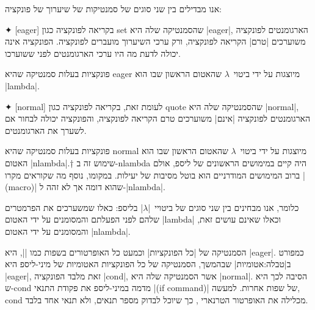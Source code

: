 אנו מבדילים בין שני סוגים של סמנטיקות של שיערוך של פונקציה:
\begin{description}
  ✦ [eager] בקריאה לפונקציה כגון set שהסמנטיקה שלה היא \E|eager|, הארגומנטים
  לפונקציה משוערכים \ע|טרם| הקריאה לפונקציה, ורק ערכי השיערוך מועברים לפונקציה.
  הפונקציה אינה יכולה לדעת מה היו ערכי הארגומנטים לפני ששוערכו.

  פונקציות בעלות סמנטיקה שהיא eager מיוצגות על ידי ביטוי~$λ$ שהאטום הראשון שבו
  הוא \T|lambda|.

  ✦ [normal] לעומת זאת, בקריאה לפונקציה כגון quote שהסמנטיקה שלה היא
  \E|normal|, הארגומנטים לפונקציה \ע|אינם| משוערכים טרם הקריאה לפונקציה,
  והפונקציה יכולה לבחור אם לשערך את הארגומנטים.

  פונקציות בעלות סמנטיקה שהיא normal מיוצגות על ידי ביטוי~$λ$ שהאטום הראשון שבו
  הוא האטום \T|nlambda|.†{%
  שימוש זה ב-nlambda היה קיים במימושים הראשונים של ליספ, אולם ברוב המימושים המודרניים
  הוא בוטל מסיבות של יעילות. במקומו, נוסף מה שקוראים מקרו \E|(macro)|
  שהוא דומה אך לא זהה ל-\E|nlambda|.}

  כלומר, אנו מבחינים בין שני סוגים של ביטויי~\E|$λ$| בליספ: כאלו שמשערכים את
  הפרמטרים שלהם לפני הפעלתם והמסומנים על ידי האטום \T|lambda| וכאלו שאינם עושים
  זאת, והמסומנים על ידי האטום \T|nlambda|.
\end{description}

הסמנטיקה של \ע|כל הפונקציות| וכמעט כל האופרטורים בשפות כמו \E|\CPL|, היא
\E|eager|. כמפורט ב|טבלה:אטומיות| שבהמשך, הסמנטיקה של כל הפונקציות
האטומיות של מיני-ליספ היא \E|eager|, זאת מלבד הפונקציה \E|cond|, אשר הסמנטיקה
שלה היא \E|normal|. הסיבה לכך היא ש-cond מדמה במיני-ליספ את פקודת התנאי \E|(if
command)| של שפות אחרות. למעשה, cond מכלילה את האופרטור הטרנארי
, כך שיוכל לבדוק מספר תנאים, ולא תנאי אחד בלבד.

